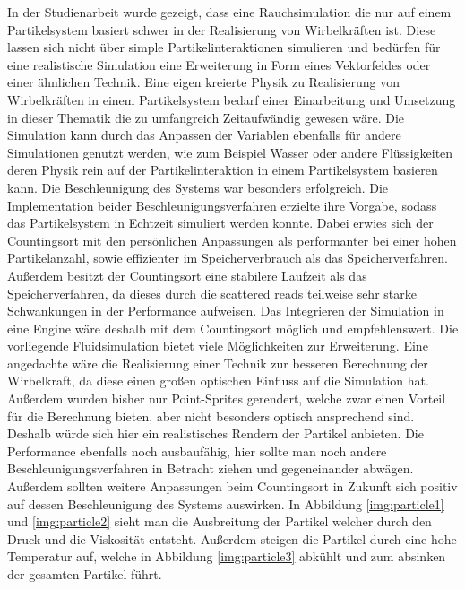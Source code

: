 \documentclass[intern,palatino]{cgBA}
\begin{document}
In der Studienarbeit wurde gezeigt, dass eine Rauchsimulation die nur auf einem Partikelsystem basiert schwer in der Realisierung von Wirbelkräften ist. Diese lassen sich nicht über simple Partikelinteraktionen simulieren und bedürfen für eine realistische Simulation eine Erweiterung in Form eines Vektorfeldes oder einer ähnlichen Technik. Eine eigen kreierte Physik zu Realisierung von Wirbelkräften in einem Partikelsystem bedarf einer Einarbeitung und Umsetzung in dieser Thematik die zu umfangreich Zeitaufwändig gewesen wäre.
\newline
Die Simulation kann durch das Anpassen der Variablen ebenfalls für andere Simulationen genutzt werden, wie zum Beispiel Wasser oder andere Flüssigkeiten deren Physik rein auf der Partikelinteraktion in einem Partikelsystem basieren kann.
\newline
Die Beschleunigung des Systems war besonders erfolgreich. Die Implementation beider Beschleunigungsverfahren erzielte ihre Vorgabe, sodass das Partikelsystem in Echtzeit simuliert werden konnte. Dabei erwies sich der Countingsort mit den persönlichen Anpassungen als performanter bei einer hohen Partikelanzahl, sowie effizienter im Speicherverbrauch als das Speicherverfahren. Außerdem besitzt der Countingsort eine stabilere Laufzeit als das Speicherverfahren, da dieses durch die scattered reads teilweise sehr starke Schwankungen in der Performance aufweisen.
\newline
Das Integrieren der Simulation in eine Engine  wäre deshalb mit dem Countingsort möglich und empfehlenswert.
\newline
Die vorliegende Fluidsimulation bietet viele Möglichkeiten zur Erweiterung. Eine angedachte wäre die Realisierung einer Technik zur besseren Berechnung der Wirbelkraft, da diese einen großen optischen Einfluss auf die Simulation hat.
\newline
Außerdem wurden bisher nur Point-Sprites gerendert, welche zwar einen Vorteil für die Berechnung bieten, aber nicht besonders optisch ansprechend sind. Deshalb würde sich hier ein realistisches Rendern der Partikel anbieten.
\newline
Die Performance ebenfalls noch ausbaufähig, hier sollte man noch andere Beschleunigungsverfahren in Betracht ziehen und gegeneinander abwägen. Außerdem sollten weitere Anpassungen beim Countingsort in Zukunft sich positiv auf dessen Beschleunigung des Systems auswirken.
\newline
In Abbildung \ref{img:particle1} und \ref{img:particle2} sieht man die Ausbreitung der Partikel welcher durch den Druck und die Viskosität entsteht. Außerdem steigen die Partikel durch eine hohe Temperatur auf, welche in Abbildung \ref{img:particle3} abkühlt und zum absinken der gesamten Partikel führt.
\end{document}
